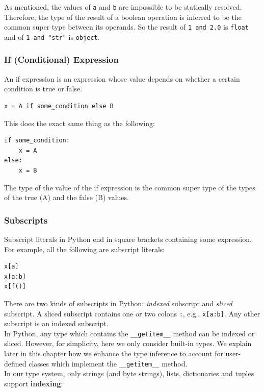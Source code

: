 As mentioned, the values of \lstinline|a| and \lstinline|b| are impossible to be statically resolved. Therefore, the type of the result of a boolean operation is inferred to be the common super type between its operands. So the result of \lstinline|1 and 2.0| is \lstinline|float| and of \lstinline|1 and "str"| is \lstinline|object|.

\subsubsection{If (Conditional) Expression}
An if expression is an expression whose value depends on whether a certain condition is true or false.
\begin{lstlisting}
x = A if some_condition else B
\end{lstlisting}
This does the exact same thing as the following:
\begin{lstlisting}
if some_condition:
	x = A
else:
	x = B
\end{lstlisting}

The type of the value of the if expression is the common super type of the types of the true (A) and the false (B) values.

\subsubsection{Subscripts}
Subscript literals in Python end in square brackets containing some expression. For example, all the following are subscript literals:
\begin{lstlisting}
x[a]
x[a:b]
x[f()]
\end{lstlisting}

There are two kinds of subscripts in Python: \textit{indexed} subscript and \textit{sliced} subscript. A sliced subscript contains one or two colons \lstinline|:|, e.g., \lstinline|x[a:b]|. Any other subscript is an indexed subscript. \\

In Python, any type which contains the \lstinline|__getitem__| method can be indexed or sliced. However, for simplicity, here we only consider built-in types. We explain later in this chapter how we enhance the type inference to account for user-defined classes which implement the \lstinline|__getitem__| method. \\

In our type system, only strings (and byte strings), lists, dictionaries and tuples support \textbf{indexing}:

